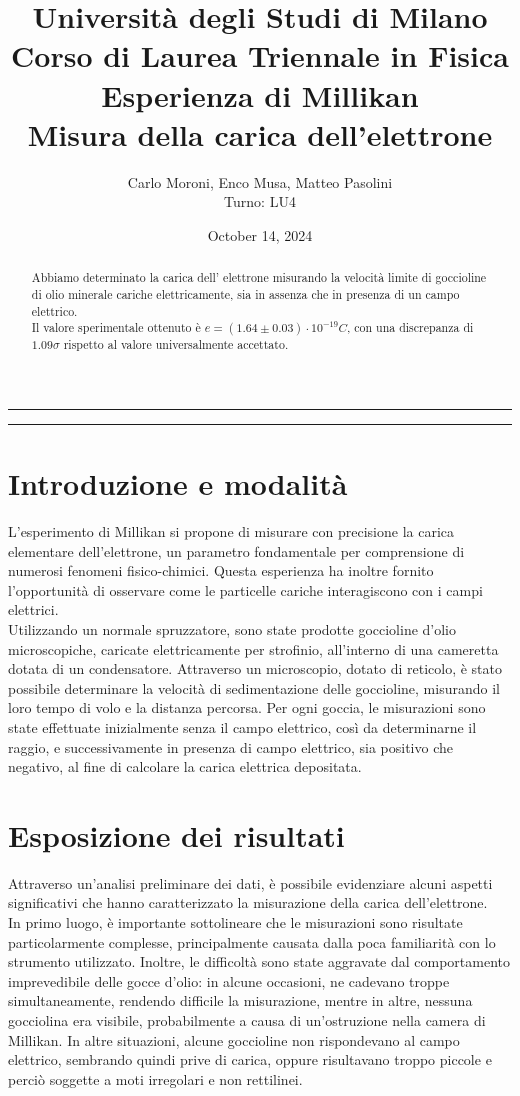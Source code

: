 \documentclass{article}
\title{{\large Università degli Studi di Milano}\\{\large Corso di Laurea Triennale in Fisica}\\{\LARGE Esperienza di Millikan}\\{\normalsize Misura della carica dell'elettrone}}
\author{Carlo Moroni, Enco Musa, Matteo Pasolini\\{Turno: LU4}}
\date{October 14, 2024}
\begin{document}
	
\maketitle
\hrule
\begin{abstract}
	\noindent Abbiamo determinato la carica dell' elettrone misurando la velocità limite di goccioline di olio minerale cariche elettricamente, sia in assenza che in presenza di un campo elettrico.\\
	Il valore sperimentale ottenuto è $e=(1.64 \pm 0.03)\cdot10^{-19} C$, con una discrepanza di $1.09\sigma$ rispetto al valore universalmente accettato. 
\end{abstract}
\hrule

\section{Introduzione e modalità}

L'esperimento di Millikan si propone di misurare con precisione la carica elementare dell'elettrone, un parametro fondamentale per comprensione di numerosi fenomeni fisico-chimici. Questa esperienza ha inoltre fornito l'opportunità di osservare come le particelle cariche interagiscono con i campi elettrici.\\

Utilizzando un normale spruzzatore, sono state prodotte goccioline d'olio microscopiche, caricate elettricamente per strofinio, all'interno di una cameretta dotata di un condensatore. Attraverso un microscopio, dotato di reticolo, è stato possibile determinare la velocità di sedimentazione delle goccioline, misurando il loro tempo di volo e la distanza percorsa. Per ogni goccia, le misurazioni sono state effettuate inizialmente senza il campo elettrico, così da determinarne il raggio, e successivamente in presenza di campo elettrico, sia positivo che negativo, al fine di calcolare la carica elettrica depositata.

\section{Esposizione dei risultati}

Attraverso un'analisi preliminare dei dati, è possibile evidenziare alcuni aspetti significativi che hanno caratterizzato la misurazione della carica dell'elettrone.\\

In primo luogo, è importante sottolineare che le misurazioni sono risultate particolarmente complesse, principalmente causata dalla poca familiarità con lo strumento utilizzato. Inoltre, le difficoltà sono state aggravate dal comportamento imprevedibile delle gocce d'olio: in alcune occasioni, ne cadevano troppe simultaneamente, rendendo difficile la misurazione, mentre in altre, nessuna gocciolina era visibile, probabilmente a causa di un'ostruzione nella camera di Millikan. In altre situazioni, alcune goccioline non rispondevano al campo elettrico, sembrando quindi prive di carica, oppure risultavano troppo piccole e perciò soggette a moti irregolari e non rettilinei.\\
\end{document}
